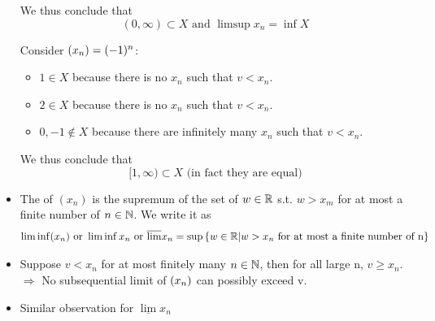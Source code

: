 \documentclass[a4paper,12pt]{article}
\begin{document}
\begin{definition}
\begin{itemize}
\begin{example}
            We thus conclude that \[(0,\infty)\subset X\text{ and } \limsup{x_n} = \inf{X}\]
        \end{example}

        \begin{example}
            Consider \((x_{n}) = (-1)^n\):
            \begin{center}
            \end{center}
            \begin{itemize}
                \item \(1\in X\) because there is no \(x_n\) such that \(v<x_n\).
                \item \(2\in X\) because there is no \(x_n\) such that \(v<x_n\).
                \item \(0,-1\notin X\) because there are infinitely many \(x_n\) such that \(v<x_n\).
            \end{itemize}
            We thus conclude that \[[1,\infty)\subset X\text{ (in fact they are equal)}\]
        \end{example}
        \item The  of \((x_n)\) is the supremum of the set of \(w\in\mathbb{R}\) s.t. \(w >x_m\) for at most a finite number of \(n\in\mathbb{N}\). We write it as
        \[\liminf(x_n)\text{ or }\liminf x_n\text{ or }\overline{\lim}x_n = \sup{\{w\in\mathbb{R}|w>x_n\text{ for at most a finite number of n}\}}\]
    \end{itemize}
\end{definition}
\newpage
{} 

\begin{itemize}
    \item Suppose \(v<x_n\) for at most finitely many \(n\in\mathbb{N}\), then for all large n, \(v\ge x_n\). \\\(\Rightarrow\) No subsequential limit of \((x_{n})\) can possibly exceed v.
    \item Similar observation for \(\underline{\lim{}}x_n\)\\
\end{itemize}
\end{document}
